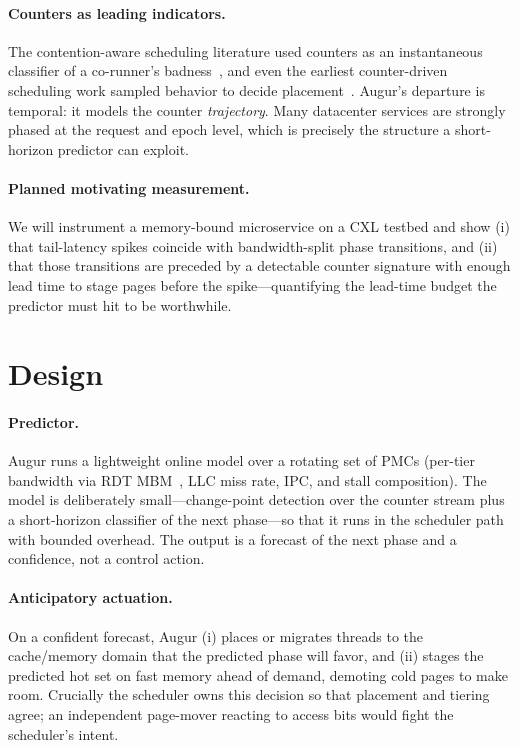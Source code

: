 \documentclass[sigconf,nonacm]{acmart}
\begin{document}
\paragraph{Counters as leading indicators.}
The contention-aware scheduling literature used counters as an instantaneous
classifier of a co-runner's badness~\cite{zhuravlev2010contention}, and even the
earliest counter-driven scheduling work sampled behavior to decide
placement~\cite{snavely2000symbiotic,suh2002memory}. Augur's departure is
temporal: it models the counter \emph{trajectory}. Many datacenter services are
strongly phased at the request and epoch level, which is precisely the structure
a short-horizon predictor can exploit.

\paragraph{Planned motivating measurement.}
We will instrument a memory-bound microservice on a CXL testbed and show (i) that
tail-latency spikes coincide with bandwidth-split phase transitions, and (ii)
that those transitions are preceded by a detectable counter signature with enough
lead time to stage pages before the spike---quantifying the lead-time budget the
predictor must hit to be worthwhile.

\section{Design}
\paragraph{Predictor.}
Augur runs a lightweight online model over a rotating set of PMCs (per-tier
bandwidth via RDT MBM~\cite{intel-rdt}, LLC miss rate, IPC, and stall
composition). The model is deliberately small---change-point detection over the
counter stream plus a short-horizon classifier of the next phase---so that it
runs in the scheduler path with bounded overhead. The output is a forecast of the
next phase and a confidence, not a control action.

\paragraph{Anticipatory actuation.}
On a confident forecast, Augur (i) places or migrates threads to the cache/memory
domain that the predicted phase will favor, and (ii) stages the predicted hot set
on fast memory ahead of demand, demoting cold pages to make room. Crucially the
scheduler owns this decision so that placement and tiering agree; an independent
page-mover reacting to access bits would fight the scheduler's intent.
\end{document}
